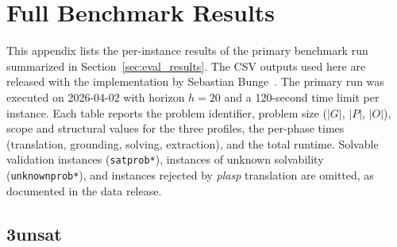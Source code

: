 \appendix
\let\origaddcontentsline\addcontentsline
\renewcommand{\addcontentsline}[3]{%
    \def\tmpa{lot}\edef\tmpb{#1}%
    \ifx\tmpa\tmpb\else\origaddcontentsline{#1}{#2}{#3}\fi%
}

\section{Full Benchmark Results}
\label{app:results}

This appendix lists the per-instance results of the primary benchmark run summarized in Section~\ref{sec:eval_results}. The CSV outputs used here are released with the implementation by Sebastian Bunge~\cite{Bunge2026}. The primary run was executed on \mbox{2026-04-02} with horizon $h = 20$ and a 120-second time limit per instance. Each table reports the problem identifier, problem size ($|G|$, $|P|$, $|O|$), scope and structural values for the three profiles, the per-phase times (translation, grounding, solving, extraction), and the total runtime. Solvable validation instances (\texttt{satprob*}), instances of unknown solvability (\texttt{unknownprob*}), and instances rejected by \textit{plasp} translation are omitted, as documented in the data release.

\subsection{3unsat}
\label{app:results_3unsat}

